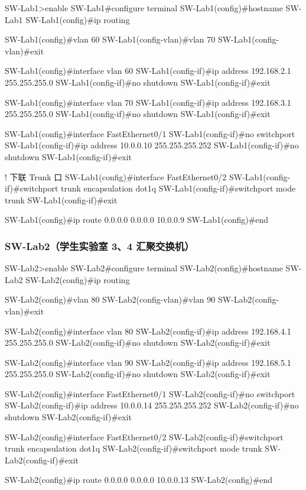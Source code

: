 \documentclass[12pt,a4paper]{ctexart}
\begin{document}
\begin{codeblock}
SW-Lab1>enable
SW-Lab1#configure terminal
SW-Lab1(config)#hostname SW-Lab1
SW-Lab1(config)#ip routing

SW-Lab1(config)#vlan 60
SW-Lab1(config-vlan)#vlan 70
SW-Lab1(config-vlan)#exit

SW-Lab1(config)#interface vlan 60
SW-Lab1(config-if)#ip address 192.168.2.1 255.255.255.0
SW-Lab1(config-if)#no shutdown
SW-Lab1(config-if)#exit

SW-Lab1(config)#interface vlan 70
SW-Lab1(config-if)#ip address 192.168.3.1 255.255.255.0
SW-Lab1(config-if)#no shutdown
SW-Lab1(config-if)#exit

SW-Lab1(config)#interface FastEthernet0/1
SW-Lab1(config-if)#no switchport
SW-Lab1(config-if)#ip address 10.0.0.10 255.255.255.252
SW-Lab1(config-if)#no shutdown
SW-Lab1(config-if)#exit

! 下联 Trunk 口
SW-Lab1(config)#interface FastEthernet0/2
SW-Lab1(config-if)#switchport trunk encapsulation dot1q
SW-Lab1(config-if)#switchport mode trunk
SW-Lab1(config-if)#exit

SW-Lab1(config)#ip route 0.0.0.0 0.0.0.0 10.0.0.9
SW-Lab1(config)#end
\end{codeblock}

\subsubsection{SW-Lab2（学生实验室 3、4 汇聚交换机）}

\begin{codeblock}
SW-Lab2>enable
SW-Lab2#configure terminal
SW-Lab2(config)#hostname SW-Lab2
SW-Lab2(config)#ip routing

SW-Lab2(config)#vlan 80
SW-Lab2(config-vlan)#vlan 90
SW-Lab2(config-vlan)#exit

SW-Lab2(config)#interface vlan 80
SW-Lab2(config-if)#ip address 192.168.4.1 255.255.255.0
SW-Lab2(config-if)#no shutdown
SW-Lab2(config-if)#exit

SW-Lab2(config)#interface vlan 90
SW-Lab2(config-if)#ip address 192.168.5.1 255.255.255.0
SW-Lab2(config-if)#no shutdown
SW-Lab2(config-if)#exit

SW-Lab2(config)#interface FastEthernet0/1
SW-Lab2(config-if)#no switchport
SW-Lab2(config-if)#ip address 10.0.0.14 255.255.255.252
SW-Lab2(config-if)#no shutdown
SW-Lab2(config-if)#exit

SW-Lab2(config)#interface FastEthernet0/2
SW-Lab2(config-if)#switchport trunk encapsulation dot1q
SW-Lab2(config-if)#switchport mode trunk
SW-Lab2(config-if)#exit

SW-Lab2(config)#ip route 0.0.0.0 0.0.0.0 10.0.0.13
SW-Lab2(config)#end
\end{codeblock}
\end{document}
